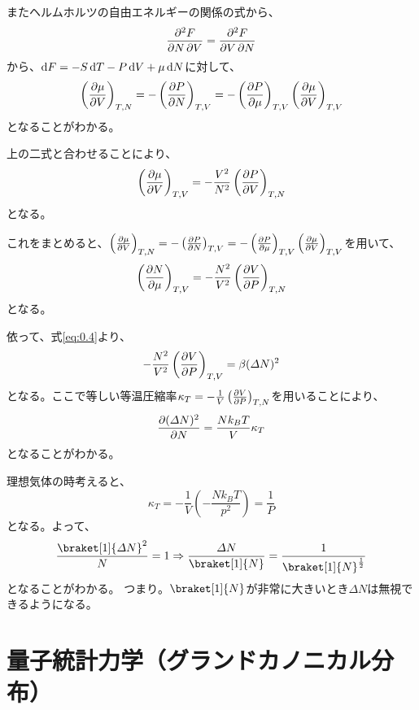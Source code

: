 \documentclass[titlepage]{ltjsarticle}
\newcommand{\ev}[1]{\braket[1]{#1}}
\begin{document}
またヘルムホルツの自由エネルギーの関係の式から、
\begin{equation}
  \pdv{F}{N,V} = \pdv{F}{V,N} 
\end{equation}
から、\(\odif{F}= -S \odif{T} -P \odif{V} + \mu \odif{N}\)に対して、
\begin{equation}
  \left( \pdv{\mu}{V} \right)_{T,N} = - \left( \pdv{P}{N} \right)_{T,V} = - \left( \pdv{P}{\mu} \right)_{T,V}\left( \pdv{\mu}{V} \right)_{T,V}
\end{equation}
となることがわかる。

上の二式と合わせることにより、
\begin{equation}
  \left(\pdv{\mu}{V}\right)_{T,V} = - \frac{V^2}{N^2}\left( \pdv{P}{V} \right)_{T,N}
\end{equation}
となる。

これをまとめると、\(  \left( \pdv{\mu}{V} \right)_{T,N} = - \left( \pdv{P}{N} \right)_{T,V} = - \left( \pdv{P}{\mu} \right)_{T,V}\left( \pdv{\mu}{V} \right)_{T,V}\)を用いて、
\begin{equation}
  \left(\pdv{N}{\mu}\right)_{T,V} = - \frac{N^2}{V^2}\left( \pdv{V}{P} \right)_{T,N}
\end{equation}
となる。

依って、式\eqref{eq:0.4}より、
\begin{equation}
  -\frac{N^2}{V^2} \left( \pdv{V}{P} \right)_{T,V} = \beta (\varDelta N)^2
\end{equation}
となる。ここで等しい等温圧縮率\(\kappa_T = - \frac{1}{V}\left( \pdv{V}{P} \right)_{T,N}\)を用いることにより、
\begin{equation}
  \pdv{(\varDelta N)^2}{N} = \frac{Nk_BT}{V}\kappa_T 
\end{equation}
となることがわかる。

理想気体の時考えると、
\begin{equation}
  \kappa_T = -\frac{1}{V} \left(  -\frac{Nk_BT}{p^2} \right) = \frac{1}{P}
\end{equation}
となる。よって、
\begin{equation}
  \frac{\ev{\varDelta N}^2}{N} = 1  \Rightarrow \frac{\varDelta N}{\ev{N}} = \frac{1}{\ev{N}^{\frac{1}{2}}}
\end{equation}
となることがわかる。
つまり。\(\ev{N}\)が非常に大きいとき\(\varDelta N\)は無視できるようになる。


\section{量子統計力学（グランドカノニカル分布）}
\end{document}
